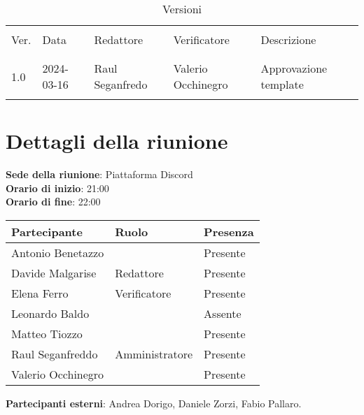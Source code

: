 \documentclass[italian,12pt]{article}
\begin{document}


\newpage



\begin{table}[!h]
	\caption{Versioni}
	\footnotesize
	\begin{center}
		\begin{tabular}{ l l l l p{6cm} }
			\hline                                                                           \\[-2ex]
			Ver. & Data       & Redattore       & Verificatore       & Descrizione           \\
			\\[-2ex] \hline \\[-1.5ex]
			1.0  & 2024-03-16 & Raul Seganfredo & Valerio Occhinegro & Approvazione template \\
			\\[-1.5ex] \hline
		\end{tabular}
	\end{center}
\end{table}

\newpage

\tableofcontents

\newpage

\section{Dettagli della riunione}

\textbf{Sede della riunione}: Piattaforma Discord\\
\textbf{Orario di inizio}: 21:00\\
\textbf{Orario di fine}: 22:00\\

\begin{flushleft}
	\begin{table}[!h]
		\begin{tabular}{ |l|l|l| }
			\hline
			\textbf{Partecipante} & \textbf{Ruolo} & \textbf{Presenza} \\
			\hline
			Antonio Benetazzo     &                & Presente          \\
			Davide Malgarise      & Redattore      & Presente          \\
			Elena Ferro           & Verificatore   & Presente          \\
			Leonardo Baldo        &                & Assente           \\
			Matteo Tiozzo         &                & Presente          \\
			Raul Seganfreddo      & Amministratore & Presente          \\
			Valerio Occhinegro    &                & Presente          \\
			\hline
		\end{tabular}
	\end{table}
	\textbf{Partecipanti esterni}: Andrea Dorigo, Daniele Zorzi, Fabio Pallaro.\\
\end{flushleft}
\end{document}
